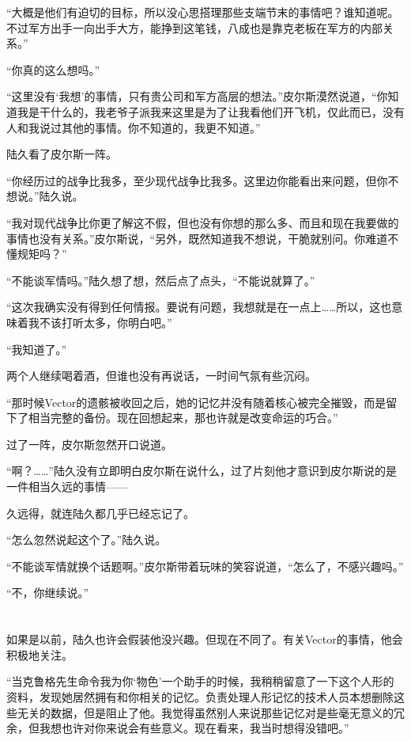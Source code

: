 “大概是他们有迫切的目标，所以没心思搭理那些支端节末的事情吧？谁知道呢。不过军方出手一向出手大方，能挣到这笔钱，八成也是靠克老板在军方的内部关系。”

“你真的这么想吗。”

“这里没有‘我想’的事情，只有贵公司和军方高层的想法。”皮尔斯漠然说道，“你知道我是干什么的，我老爷子派我来这里是为了让我看他们开飞机，仅此而已，没有人和我说过其他的事情。你不知道的，我更不知道。”

陆久看了皮尔斯一阵。

“你经历过的战争比我多，至少现代战争比我多。这里边你能看出来问题，但你不想说。”陆久说。

“我对现代战争比你更了解这不假，但也没有你想的那么多、而且和现在我要做的事情也没有关系。”皮尔斯说，“另外，既然知道我不想说，干脆就别问。你难道不懂规矩吗？”

“不能谈军情吗。”陆久想了想，然后点了点头，“不能说就算了。”

“这次我确实没有得到任何情报。要说有问题，我想就是在一点上……所以，这也意味着我不该打听太多，你明白吧。”

“我知道了。”

两个人继续喝着酒，但谁也没有再说话，一时间气氛有些沉闷。

“那时候Vector的遗骸被收回之后，她的记忆并没有随着核心被完全摧毁，而是留下了相当完整的备份。现在回想起来，那也许就是改变命运的巧合。”

过了一阵，皮尔斯忽然开口说道。

“啊？……”陆久没有立即明白皮尔斯在说什么，过了片刻他才意识到皮尔斯说的是一件相当久远的事情——

久远得，就连陆久都几乎已经忘记了。

“怎么忽然说起这个了。”陆久说。

“不能谈军情就换个话题啊。”皮尔斯带着玩味的笑容说道，“怎么了，不感兴趣吗。”

“不，你继续说。”

\section*{}

如果是以前，陆久也许会假装他没兴趣。但现在不同了。有关Vector的事情，他会积极地关注。

“当克鲁格先生命令我为你‘物色’一个助手的时候，我稍稍留意了一下这个人形的资料，发现她居然拥有和你相关的记忆。负责处理人形记忆的技术人员本想删除这些无关的数据，但是阻止了他。我觉得虽然别人来说那些记忆对是些毫无意义的冗余，但我想也许对你来说会有些意义。现在看来，我当时想得没错吧。”

